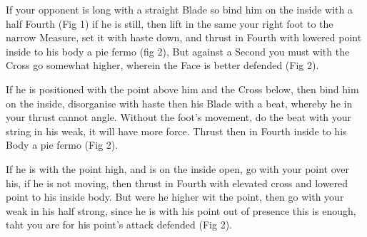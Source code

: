 \newpage


\newpage


\exercise{}
If your opponent is long with a straight Blade so bind him on the
inside with a half Fourth (Fig 1) if he is still, then lift in the
same your right foot to the narrow Measure, set it with haste down,
and thrust in Fourth with lowered point inside to his body a pie fermo
(fig 2), But against a Second you must with the Cross go somewhat
higher, wherein the Face is better defended (Fig 2).

\exercise{}
If he is positioned with the point above him and the Cross below, then
bind him on the inside, disorganise with haste then his Blade with a
beat, whereby he in your thrust cannot angle. Without the foot's
movement, do the beat with your string in his weak, it will have more
force. Thrust then in Fourth inside to his Body a pie fermo (Fig 2).


\exercise{}
If he is with the point high, and is on the inside open, go with your
point over his, if he is not moving, then thrust in Fourth with
elevated cross and lowered point to his inside body. But were he
higher wit the point, then go with your weak in his half strong, since
he is with his point out of presence this is enough, taht you are for
his point's attack defended (Fig 2).
